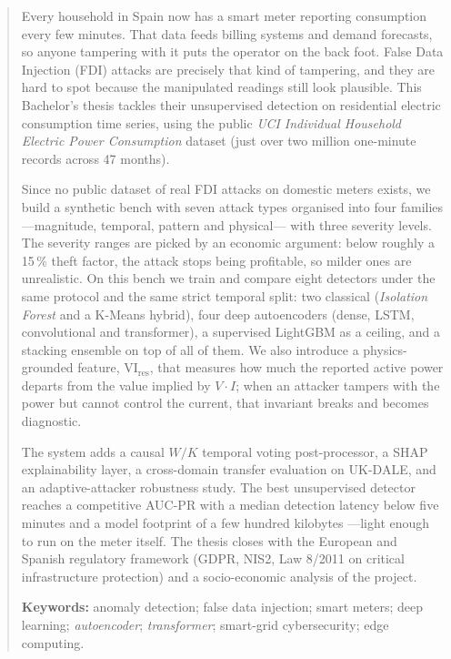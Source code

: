 \documentclass[12pt]{report}
\theoremstyle{remark}
\newcommand{\vires}{\mathrm{VI}_{\text{res}}}
\begin{document}
\renewcommand\abstractname{\large\bfseries\filcenter\uppercase{Abstract}}
\begin{abstract}
\thispagestyle{plain}

	Every household in Spain now has a smart meter reporting consumption every few minutes. That data feeds billing systems and demand forecasts, so anyone tampering with it puts the operator on the back foot. False Data Injection (FDI) attacks are precisely that kind of tampering, and they are hard to spot because the manipulated readings still look plausible. This Bachelor's thesis tackles their unsupervised detection on residential electric consumption time series, using the public \textit{UCI Individual Household Electric Power Consumption} dataset (just over two million one-minute records across 47 months).

	Since no public dataset of real FDI attacks on domestic meters exists, we build a synthetic bench with seven attack types organised into four families ---magnitude, temporal, pattern and physical--- with three severity levels. The severity ranges are picked by an economic argument: below roughly a 15\,\% theft factor, the attack stops being profitable, so milder ones are unrealistic. On this bench we train and compare eight detectors under the same protocol and the same strict temporal split: two classical (\textit{Isolation Forest} and a K\nobreakdash-Means hybrid), four deep autoencoders (dense, LSTM, convolutional and transformer), a supervised LightGBM as a ceiling, and a stacking ensemble on top of all of them. We also introduce a physics-grounded feature, $\vires$, that measures how much the reported active power departs from the value implied by $V\cdot I$; when an attacker tampers with the power but cannot control the current, that invariant breaks and becomes diagnostic.

	The system adds a causal $W/K$ temporal voting post-processor, a SHAP explainability layer, a cross-domain transfer evaluation on UK-DALE, and an adaptive-attacker robustness study. The best unsupervised detector reaches a competitive AUC-PR with a median detection latency below five minutes and a model footprint of a few hundred kilobytes ---light enough to run on the meter itself. The thesis closes with the European and Spanish regulatory framework (GDPR, NIS2, Law 8/2011 on critical infrastructure protection) and a socio-economic analysis of the project.

	\textbf{Keywords:} anomaly detection; false data injection; smart meters; deep learning; \textit{autoencoder}; \textit{transformer}; smart-grid cybersecurity; edge computing.

	\vfill
\end{abstract}
	\newpage
	\thispagestyle{empty}
	\mbox{}
\end{document}
